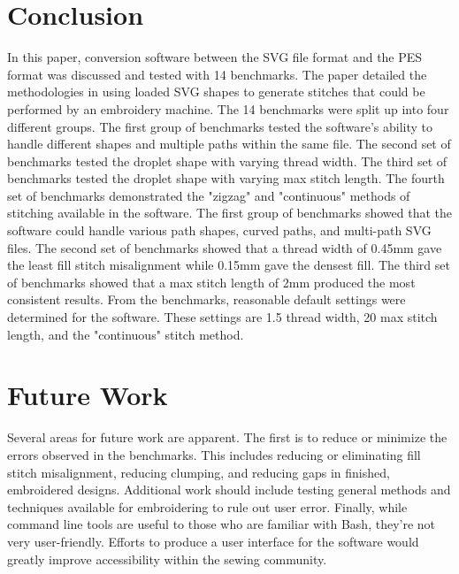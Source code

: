 \documentclass{article}
\begin{document}
\section{Conclusion}

In this paper, conversion software between the SVG file format and the PES format was discussed and tested with 14 benchmarks. The paper detailed the methodologies in using loaded SVG shapes to generate stitches that could be performed by an embroidery machine. The 14 benchmarks were split up into four different groups. The first group of benchmarks tested the software's ability to handle different shapes and multiple paths within the same file. The second set of benchmarks tested the droplet shape with varying thread width. The third set of benchmarks tested the droplet shape with varying max stitch length. The fourth set of benchmarks demonstrated the "zigzag" and "continuous" methods of stitching available in the software. The first group of benchmarks showed that the software could handle various path shapes, curved paths, and multi-path SVG files. The second set of benchmarks showed that a thread width of 0.45mm gave the least fill stitch misalignment while 0.15mm gave the densest fill. The third set of benchmarks showed that a max stitch length of 2mm produced the most consistent results. From the benchmarks, reasonable default settings were determined for the software. These settings are 1.5 thread width, 20 max stitch length, and the "continuous" stitch method.

\section{Future Work}

Several areas for future work are apparent. The first is to reduce or minimize the errors observed in the benchmarks. This includes reducing or eliminating fill stitch misalignment, reducing clumping, and reducing gaps in finished, embroidered designs. Additional work should include testing general methods and techniques available for embroidering to rule out user error. Finally, while command line tools are useful to those who are familiar with Bash, they're not very user-friendly. Efforts to produce a user interface for the software would greatly improve accessibility within the sewing community.



\end{document}
